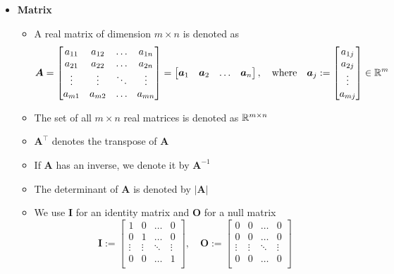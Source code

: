 \documentclass[12pt,a4paper]{article}
\begin{document}
\begin{itemize}
\item \textbf{Matrix}
  \begin{itemize}
  \item A real matrix of dimension $m\times n$ is denoted as
    \begin{equation}\nonumber%
      \bm{A} =
      \begin{bmatrix}
        a_{11} & a_{12} & \ldots & a_{1n} \\
        a_{21} & a_{22} & \ldots & a_{2n} \\
        \vdots & \vdots & \ddots & \vdots \\
        a_{m1} & a_{m2} & \ldots & a_{mn} \\
      \end{bmatrix}
      = 
      \begin{bmatrix}
        \bm{a}_{1} & \bm{a}_{2} & \ldots & \bm{a}_{n} \\
      \end{bmatrix},
      \quad\text{where}\quad
      \bm{a}_{j} :=
      \begin{bmatrix}
        a_{1j} \\
        a_{2j} \\
        \vdots \\
        a_{mj} \\
      \end{bmatrix}\in \R^{m}
    \end{equation}
  \item The set of all $m\times n$ real matrices is denoted as $\mathbb{R}^{m\times n}$
  \item $\bm{A}^{\top}$ denotes the transpose of $\bm{A}$
  \item If $\bm{A}$ has an inverse, we denote it by $\bm{A}^{-1}$
  \item The determinant of $\bm{A}$ is denoted by $|\bm{A}|$ 
  \item We use $\bm{I}$ for an identity matrix
    and $\bm{O}$ for a null matrix
    \begin{equation}\nonumber%
      \bm{I} :=
      \begin{bmatrix}
        1 & 0 & \ldots & 0 \\
        0 & 1 & \ldots & 0 \\
        \vdots & \vdots & \ddots & \vdots \\
        0 & 0 & \ldots & 1 \\
      \end{bmatrix},
      \quad
      \bm{O} :=
      \begin{bmatrix}
        0 & 0 & \ldots & 0 \\
        0 & 0 & \ldots & 0 \\
        \vdots & \vdots & \ddots & \vdots \\
        0 & 0 & \ldots & 0 \\
      \end{bmatrix}
    \end{equation}
  \end{itemize}


\end{itemize}
\end{document}
